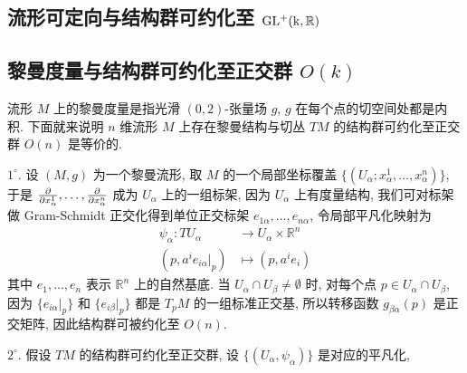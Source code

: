     \subsection{流形可定向与结构群可约化至 ${\rm GL^+(k,\mathbb{R})}$}

    \subsection{黎曼度量与结构群可约化至正交群 $O(k)$}
    流形 $M$ 上的黎曼度量是指光滑 $(0,2)$-张量场 $g$, $g$ 在每个点的切空间处都是内积.
    下面就来说明 $n$ 维流形 $M$ 上存在黎曼结构与切丛 $TM$ 的结构群可约化至正交群 $O(n)$ 是等价的.

    \noindent $1^{\circ}.$ 设 $(M,g)$ 为一个黎曼流形, 取 $M$ 的一个局部坐标覆盖 $\{(U_{\alpha};x^1_{\alpha},\dots,x^n_{\alpha})\}$, 于是 $\frac{\partial }{\partial x^1_{\alpha}},\dots,\frac{\partial }{\partial x^n_{\alpha}}$ 成为 $U_{\alpha}$ 上的一组标架, 因为 $U_{\alpha}$ 上有度量结构, 
    我们可对标架做 Gram-Schmidt 正交化得到单位正交标架 $e_{1\alpha},\dots,e_{n\alpha}$, 令局部平凡化映射为
    \begin{align*}
        \psi_{\alpha}:TU_{\alpha}&\rightarrow U_{\alpha}\times\mathbb{R}^n \\
        (p,a^ie_{i\alpha}|_p)&\mapsto(p,a^ie_i)
    \end{align*}
    其中 $e_1,\dots,e_n$ 表示 $\mathbb{R}^n$ 上的自然基底. 当 $U_{\alpha}\cap U_{\beta}\neq\emptyset$ 时, 对每个点 $p\in U_{\alpha}\cap U_{\beta}$, 因为 $\{e_{i\alpha}|_p\}$ 和 $\{e_{i\beta}|_p\}$ 都是 $T_pM$ 的一组标准正交基, 
    所以转移函数 $g_{\beta\alpha}(p)$ 是正交矩阵, 因此结构群可被约化至 $O(n)$.

    \noindent $2^{\circ}.$ 假设 $TM$ 的结构群可约化至正交群, 设 $\{(U_{\alpha},\psi_{\alpha})\}$ 是对应的平凡化, 